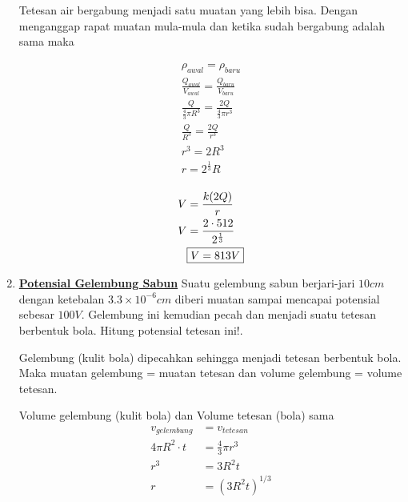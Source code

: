 \begin{enumerate}
    Tetesan air bergabung menjadi satu muatan yang lebih bisa. Dengan menganggap rapat muatan mula-mula dan ketika sudah bergabung adalah sama maka
    \begin{minipage}{0.5\textwidth}
    \begin{align*}
        \rho_{awal}=\rho_{baru}\\
        \frac{Q_{awal}}{V_{awal}}=\frac{Q_{baru}}{V_{baru}}\\
        \frac{Q}{\frac{4}{3}\pi R^{3}}=\frac{2Q}{\frac{4}{3}\pi r^{3}}\\
        \frac{Q}{R^{3}}=\frac{2Q}{r^{3}}\\
        r^{3}=2R^{3}\\
        r=2^{\frac{1}{3}}R\\
    \end{align*}
    \end{minipage}
    \hfill
    \begin{minipage}{0.3\textwidth}
    \begin{align*}
        V &= \frac{k(2Q)}{r}\\
        V &= \frac{2\cdot512}{2^{\frac{1}{3}}}\\
        &\fbox{$V= 813V$}
    \end{align*}
    \end{minipage}

    \item \underline{\textbf{Potensial Gelembung Sabun}}
    \vskip5pt
    Suatu gelembung sabun berjari-jari $10cm$ dengan ketebalan $3.3\times 10^{-6}cm$ diberi muatan sampai mencapai potensial sebesar $100V$. Gelembung ini kemudian pecah dan menjadi suatu tetesan berbentuk bola. Hitung potensial tetesan ini!.

    \begin{center}
    \end{center}

    Gelembung (kulit bola) dipecahkan sehingga menjadi tetesan berbentuk bola. Maka muatan gelembung = muatan tetesan dan volume gelembung = volume tetesan.

    \begin{minipage}{0.4\textwidth}
    Volume gelembung (kulit bola) dan Volume tetesan (bola) sama
    \begin{align*}
        v_{gelembung}&=v_{tetesan}\\
        4\pi R^{2}\cdot t &= \frac{4}{3}\pi r^{3}\\
        r^{3}&=3R^{2}t\\
        r&=(3R^{2}t)^{1/3}
    \end{align*}


\end{minipage}
\end{enumerate}
